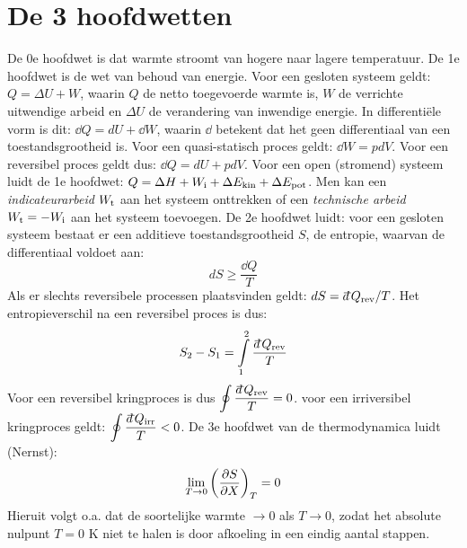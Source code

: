 \section{De 3 hoofdwetten}
De 0e hoofdwet is dat warmte stroomt van hogere naar lagere temperatuur.
De 1e hoofdwet is de wet van behoud van energie. Voor een gesloten systeem
geldt: $Q=\Delta U+W$, waarin $Q$ de netto toegevoerde warmte is, $W$ de
verrichte uitwendige arbeid en $\Delta U$ de verandering van inwendige
energie. In differenti\"ele vorm is dit: $\dd Q=dU+\dd W$, waarin $\dd$
betekent dat het geen differentiaal van een toestandsgrootheid is. Voor een
quasi-statisch proces geldt: $\dd W=pdV$. Voor een reversibel proces geldt
dus: $\dd Q=dU+pdV$.
\npar
Voor een open (stromend) systeem luidt de 1e hoofdwet:
$Q=\Delta H+W_{\rm i}+\Delta E_{\rm kin}+\Delta E_{\rm pot}$. Men kan een
{\it indicateurarbeid} $W_{\rm t}$ aan het systeem onttrekken of een
{\it technische arbeid} $W_{\rm t}=-W_{\rm i}$ aan het systeem toevoegen.
\npar
De 2e hoofdwet luidt: voor een gesloten systeem bestaat er een additieve
toestandsgrootheid $S$, de entropie, waarvan de differentiaal voldoet aan:
\[
dS\geq\frac{\dd Q}{T}
\]
Als er slechts reversibele processen plaatsvinden geldt:
$dS=\dd Q_{\rm rev}/T$. Het entropieverschil na een reversibel proces is dus:
\[
S_2-S_1=\int\limits_1^2 \frac{\dd Q_{\rm rev}}{T}
\]
Voor een reversibel kringproces is dus $\displaystyle\oint\frac{\dd Q_{\rm rev}}{T}=0$.
\npar
voor een irriversibel kringproces geldt: $\displaystyle\oint\frac{\dd Q_{\rm irr}}{T}<0$.
\npar
De 3e hoofdwet van de thermodynamica luidt (Nernst):
\[
\lim_{T\rightarrow0}\left(\frac{\partial S}{\partial X}\right)_{T}=0
\]
Hieruit volgt o.a. dat de soortelijke warmte $\rightarrow0$ als
$T\rightarrow0$, zodat het absolute nulpunt $T=0$ K niet te halen is door
afkoeling in een eindig aantal stappen.

